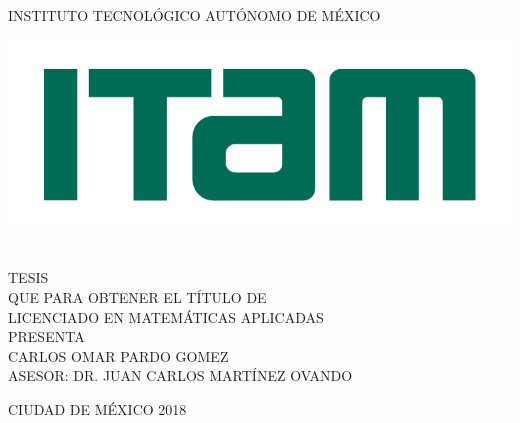 \begin{titlepage}
\begin{center}

\large{INSTITUTO TECNOL\'OGICO AUT\'ONOMO DE M\'EXICO}\\[2em]
\hline

\begin{center}
	\includegraphics{Figures/Miscellaneous/logo-ITAM.pdf}
\end{center}

\vspace{1em}

{}\\[3em]

\textsc{\large TESIS}\\[1em]

\textsc{\normalsize QUE PARA OBTENER EL T\'ITULO DE}\\[1em]

\textsc{\normalsize LICENCIADO EN MATEM\'ATICAS APLICADAS}\\[1em]

\textsc{\normalsize PRESENTA}\\[1em]

\textsc{\Large CARLOS OMAR PARDO GOMEZ}\\[3em]

\textsc{\normalsize ASESOR: DR. JUAN CARLOS MART\'INEZ OVANDO}

\end{center}

\vspace*{\fill}
\textsc{CIUDAD DE M\'EXICO \hspace*{\fill} 2018}

\end{titlepage}